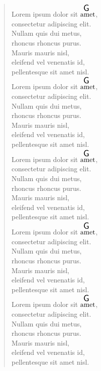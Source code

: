 \documentclass[twocolumn]{article}
\begin{document}
\begin{verse}
Lorem ipsum dolor sit $\overset{ \resizebox{0.3cm}{!}{\textsf{G}} }{\text{amet}}$, \\
consectetur adipiscing elit.\\
Nullam quis dui metus, \\
rhoncus rhoncus purus. \\
Mauris mauris nisl, \\
eleifend vel venenatis id, \\
pellentesque sit amet nisl.\\

Lorem ipsum dolor sit $\overset{ \resizebox{0.3cm}{!}{\textsf{G}} }{\text{amet}}$, \\
consectetur adipiscing elit.\\
Nullam quis dui metus, \\
rhoncus rhoncus purus. \\
Mauris mauris nisl, \\
eleifend vel venenatis id, \\
pellentesque sit amet nisl.\\

Lorem ipsum dolor sit $\overset{ \resizebox{0.3cm}{!}{\textsf{G}} }{\text{amet}}$, \\
consectetur adipiscing elit.\\
Nullam quis dui metus, \\
rhoncus rhoncus purus. \\
Mauris mauris nisl, \\
eleifend vel venenatis id, \\
pellentesque sit amet nisl.\\

Lorem ipsum dolor sit $\overset{ \resizebox{0.3cm}{!}{\textsf{G}} }{\text{amet}}$, \\
consectetur adipiscing elit.\\
Nullam quis dui metus, \\
rhoncus rhoncus purus. \\
Mauris mauris nisl, \\
eleifend vel venenatis id, \\
pellentesque sit amet nisl.\\

Lorem ipsum dolor sit $\overset{ \resizebox{0.3cm}{!}{\textsf{G}} }{\text{amet}}$, \\
consectetur adipiscing elit.\\
Nullam quis dui metus, \\
rhoncus rhoncus purus. \\
Mauris mauris nisl, \\
eleifend vel venenatis id, \\
pellentesque sit amet nisl.\\


\end{verse}
\end{document}
